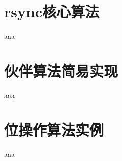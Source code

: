 ﻿\documentclass[a4paper,11pt]{article}
\begin{document}
  \tt %
  \pagestyle{header}
  \sybmaketitle
  \tableofcontents
  \newpage

  \pagestyle{main}
  \setcounter{page}{1}
  
  \section[rsync核心算法]{rsync核心算法}
  aaa
  
  \section[伙伴算法简易实现]{伙伴算法简易实现}
  aaa
  
  \section[位操作算法实例]{位操作算法实例}
  aaa
  
  
  
\end{document}
